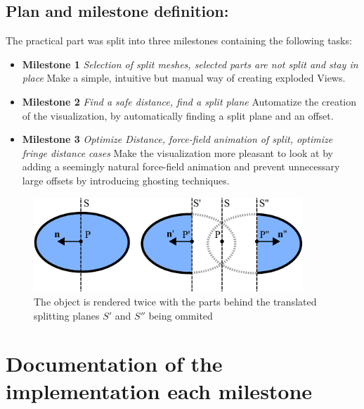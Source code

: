 \subsection{Plan and milestone definition:}
The practical part was split into three milestones containing the following tasks:
\begin{itemize}
\item \textbf{Milestone 1} \emph{Selection of split meshes, selected parts are not split and stay in place} Make a simple, intuitive but manual way of creating exploded Views.
\item \textbf{Milestone 2} \emph{Find a safe distance, find a split plane} Automatize the creation of the visualization, by automatically finding a split plane and an offset.
\item \textbf{Milestone 3} \emph{Optimize Distance, force-field animation of split, optimize fringe distance cases} Make the visualization more pleasant to look at by adding a seemingly natural force-field animation and prevent unnecessary large offsets by introducing ghosting techniques.
\end{itemize}
\begin{figure}[tb]
	\centering
	\includegraphics[width=0.9\textwidth]{chapters/figures/splitting_explained}
	\caption{The object is rendered twice with the parts behind the translated splitting planes $S'$ and $S''$ being ommited}
	\label{fig:splitting_explained}
\end{figure}
\section{Documentation of the implementation each milestone}
